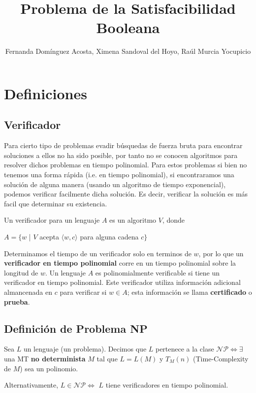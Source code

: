 \documentclass[a4paper]{article}
\title{Problema de la Satisfacibilidad Booleana}
\author{Fernanda Domínguez Acosta, Ximena Sandoval del Hoyo, Raúl Murcia Yocupicio}
\begin{document}
\maketitle


\section{Definiciones}

\subsection{Verificador}
Para cierto tipo de problemas evadir búsquedas de fuerza bruta para encontrar
soluciones a ellos no ha sido posible, por tanto no se conocen algoritmos para
resolver dichos problemas en tiempo polinomial.
Para estos problemas si bien no tenemos una forma rápida (i.e. en tiempo
polinomial), si encontraramos una solución de alguna manera (usando un algoritmo
de tiempo exponencial), podemos verificar facilmente dicha solución.
Es decir, verificar la solución es más facil que determinar su existencia.

Un verificador para un lenguaje $A$ es un algoritmo $V$, donde
\begin{center}
$A = \{w$ | $V$ acepta $\langle w, c\rangle$ para alguna cadena $c\}$
\end{center}
Determinamos el tiempo de un verificador solo en terminos de $w$, por lo que un
\textbf{verificador en tiempo polinomial} corre en un tiempo polinomial sobre la
longitud de $w$. Un lenguaje $A$ es polinomialmente verificable si tiene un
verificador en tiempo polinomial.
Este verificador utiliza información adicional almancenada en $c$ para verificar
si $w \in A$; esta información se llama \textbf{certificado} o \textbf{prueba}.

\subsection{Definición de Problema NP}

Sea $L$ un lenguaje (un problema). Decimos que $L$ pertenece a la clase
$\mathcal{NP} \Leftrightarrow \exists$ una MT \textbf{no determinista} $M$
tal que $L = L(M)$ y $T_M(n)$ (Time-Complexity de $M$) sea un polinomio.

Alternativamente, $L \in \mathcal{NP} \Leftrightarrow$ $L$ tiene verificadores
en tiempo polinomial.
\end{document}
